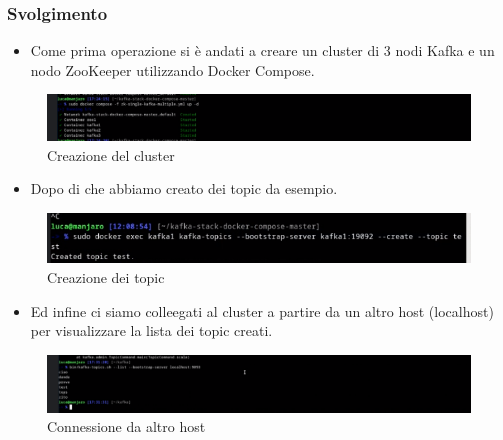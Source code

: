 \documentclass{article}
\begin{document}
\subsubsection{Svolgimento}
\begin{itemize}
    \item Come prima operazione si è andati a creare un cluster di 3 nodi Kafka e un nodo ZooKeeper utilizzando Docker Compose.
\end{itemize}
\begin{figure}[H]
    \centering
    \includegraphics[scale=0.5]{images/cluster.png}
    \caption{Creazione del cluster}
    \label{fig:my_label}
\end{figure}
\begin{itemize}
    \item Dopo di che abbiamo creato dei topic da esempio.
\end{itemize}
\begin{figure}[H]
    \centering
    \includegraphics[scale=0.5]{images/create_topic.png}
    \caption{Creazione dei topic}
    \label{fig:my_label}
\end{figure}
\begin{itemize}
    \item Ed infine ci siamo colleegati al cluster a partire da un altro host (localhost) per visualizzare la lista dei topic creati.
\end{itemize}
\begin{figure}[H]
    \centering
    \includegraphics[scale=0.5]{images/test_connect_another_host.png}
    \caption{Connessione da altro host}
    \label{fig:my_label}
\end{figure}




\end{document}
